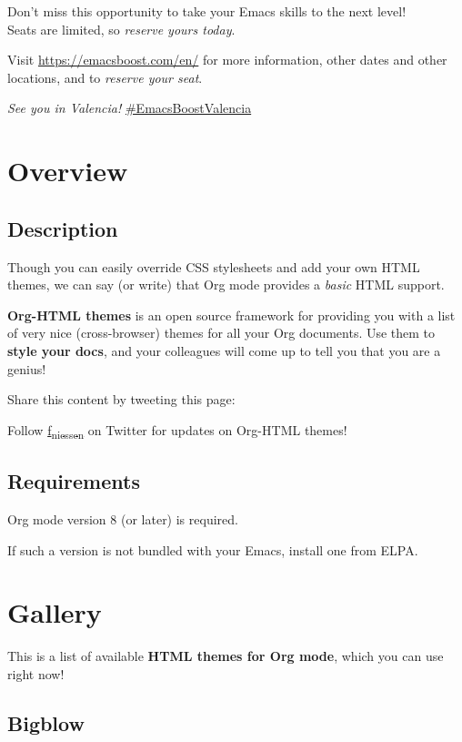 \documentclass[11pt]{article}
\begin{document}
Don't miss this opportunity to take your Emacs skills to the next level! \\[0pt]
Seats are limited, so \emph{reserve yours today}.

Visit \url{https://emacsboost.com/en/} for more information, other dates and other
locations, and to \emph{reserve your seat}.

\emph{See you in Valencia!}  \href{https://emacsboost.com/en/}{\#EmacsBoostValencia}

\section{Overview}
\label{sec:org75a5b9c}

\subsection{Description}
\label{sec:org59eb686}

Though you can easily override CSS stylesheets and add your own HTML themes, we
can say (or write) that Org mode provides a \emph{basic} HTML support.

\textbf{Org-HTML themes} is an open source framework for providing you with a list of
very nice (cross-browser) themes for all your Org documents.  Use them to \textbf{style
your docs}, and your colleagues will come up to tell you that you are a genius!

Share this content by tweeting this page:

Follow \href{https://twitter.com/f\_niessen}{f\textsubscript{niessen}} on Twitter for updates on Org-HTML themes!

\subsection{Requirements}
\label{sec:orgb6b2d60}

Org mode version 8 (or later) is required.

If such a version is not bundled with your Emacs, install one from ELPA.

\section{Gallery}
\label{sec:org5fdcf56}
This is a list of available \textbf{HTML themes for Org mode}, which you can use right
now!

\subsection{Bigblow}
\label{sec:orgd8cf014}
\end{document}
